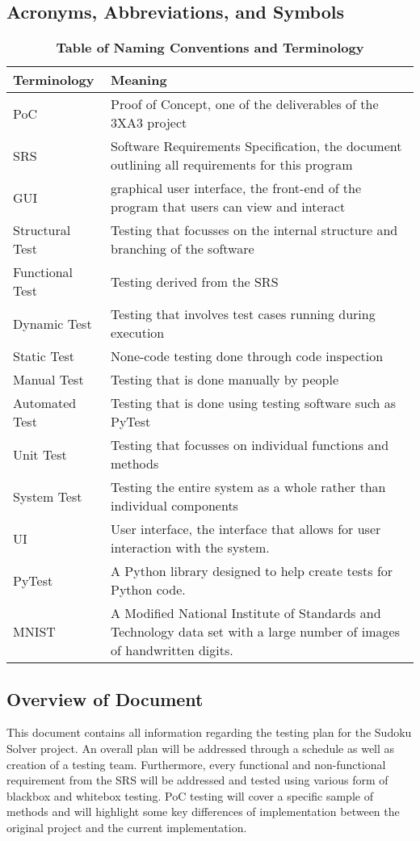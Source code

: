 \documentclass[11pt]{article}
\begin{document}
\subsection{Acronyms, Abbreviations, and Symbols}
\begin{table}[H]
\caption{\bf Table of Naming Conventions and Terminology} \label{Table}
\centering
\begin{tabularx}{\textwidth}{p{3cm}X}
\toprule
Terminology     & Meaning \\
\midrule
PoC & Proof of Concept, one of the deliverables of the 3XA3 project\\
SRS & Software Requirements Specification, the document outlining all requirements for this program\\
GUI & graphical user interface, the front-end of the program that users can view and interact\\
Structural Test & Testing that focusses on the internal structure and branching of the software\\
Functional Test & Testing derived from the SRS\\
Dynamic Test & Testing that involves test cases running during execution\\
Static Test & None-code testing done through code inspection\\
Manual Test & Testing that is done manually by people\\
Automated Test & Testing that is done using testing software such as PyTest\\
Unit Test & Testing that focusses on individual functions and methods\\
System Test & Testing the entire system as a whole rather than individual components\\
UI     & User interface, the interface that allows for user interaction with the system. \\
PyTest & A Python library designed to help create tests for Python code. \\
MNIST & A Modified National Institute of Standards and Technology data set with a large number of images of handwritten digits.
\bottomrule
\end{tabularx}
\end{table}

\subsection{Overview of Document}
This document contains all information regarding the testing plan for the Sudoku Solver project. An overall plan will be addressed through a schedule as well as creation of a testing team. Furthermore, every functional and non-functional requirement from the SRS will be addressed and tested using various form of blackbox and whitebox testing. PoC testing will cover a specific sample of methods and will highlight some key differences of implementation between the original project and the current implementation.
\end{document}
